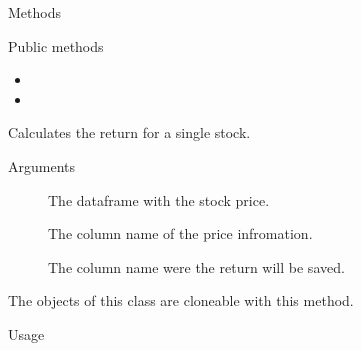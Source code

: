 \documentclass[a4paper]{book}
\begin{document}
%
\begin{Section}{Methods}
%
\begin{SubSection}{Public methods}
\begin{itemize}

\item{} 
\item{} 

\end{itemize}

\end{SubSection}



\hypertarget{method-ReturnCalculation-calculate_return}{}
%
\begin{SubSection}{}
Calculates the return for a
single stock.
%

%
\begin{SubSubSection}{Arguments}

\begin{description}

\item[] The dataframe with the stock price.
\item[] The column name of the price
infromation.
\item[] The column name were the
return will be saved.

\end{description}



\end{SubSubSection}

\end{SubSection}




\hypertarget{method-ReturnCalculation-clone}{}
%
\begin{SubSection}{}
The objects of this class are cloneable with this method.
%
\begin{SubSubSection}{Usage}


\end{SubSubSection}
\end{SubSection}
\end{Section}
\end{document}
